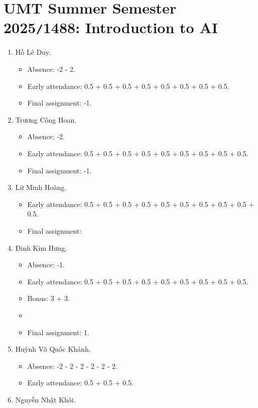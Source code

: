 \documentclass{article}
\begin{document}

\section{UMT Summer Semester 2025{\tt/}1488: Introduction to AI}

\begin{enumerate}
	\item {\sc Hồ Lê Duy.}
	\begin{itemize}
		\item Absence: -2 - 2.
		\item Early attendance: 0.5 + 0.5 + 0.5 + 0.5 + 0.5 + 0.5 + 0.5 + 0.5.
        \item Final assignment: -1.
	\end{itemize}
	\item {\sc Trương Công Hoan.}
	\begin{itemize}
		\item Absence: -2.
		\item Early attendance: 0.5 + 0.5 + 0.5 + 0.5 + 0.5 + 0.5 + 0.5 + 0.5 + 0.5.
        \item Final assignment: -1.
	\end{itemize}
	\item {\sc Lữ Minh Hoàng.}
	\begin{itemize}
		\item Early attendance: 0.5 + 0.5 + 0.5 + 0.5 + 0.5 + 0.5 + 0.5 + 0.5 + 0.5 + 0.5.
        \item Final assignment:
	\end{itemize}
	\item {\sc Đinh Kim Hưng.}
	\begin{itemize}
        \item Absence: -1.
		\item Early attendance: 0.5 + 0.5 + 0.5 + 0.5 + 0.5 + 0.5 + 0.5 + 0.5 + 0.5.
		\item Bonus: 3 + 3.
        \item \item Final assignment: 1.
	\end{itemize}
	\item {\sc Huỳnh Võ Quốc Khánh.}
	\begin{itemize}
		\item Absence: -2 - 2 - 2 - 2 - 2 - 2.
		\item Early attendance: 0.5 + 0.5 + 0.5.
	\end{itemize}
	\item {\sc Nguyễn Nhật Khôi.}

\end{enumerate}
\end{document}
